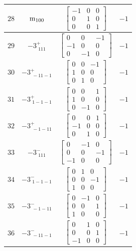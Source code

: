 \documentclass[fleqn,8pt]{jsarticle}
\begin{document}
\begin{longtable}{cccc}
$ 28 $ & $ {\rm m}_{100} $ & $ \begin{bmatrix} -1 & 0 & 0 \\ 0 & 1 & 0 \\ 0 & 0 & 1 \end{bmatrix} $ & $ -1 $ \\ \hline
$ 29 $ & $ -3^{+}_{\,\,111} $ & $ \begin{bmatrix} 0 & 0 & -1 \\ -1 & 0 & 0 \\ 0 & -1 & 0 \end{bmatrix} $ & $ -1 $ \\ \hline
$ 30 $ & $ -3^{+}_{\,\,-11-1} $ & $ \begin{bmatrix} 0 & 0 & -1 \\ 1 & 0 & 0 \\ 0 & 1 & 0 \end{bmatrix} $ & $ -1 $ \\ \hline
$ 31 $ & $ -3^{+}_{\,\,1-1-1} $ & $ \begin{bmatrix} 0 & 0 & 1 \\ 1 & 0 & 0 \\ 0 & -1 & 0 \end{bmatrix} $ & $ -1 $ \\ \hline
$ 32 $ & $ -3^{+}_{\,\,-1-11} $ & $ \begin{bmatrix} 0 & 0 & 1 \\ -1 & 0 & 0 \\ 0 & 1 & 0 \end{bmatrix} $ & $ -1 $ \\ \hline
$ 33 $ & $ -3^{-}_{\,\,111} $ & $ \begin{bmatrix} 0 & -1 & 0 \\ 0 & 0 & -1 \\ -1 & 0 & 0 \end{bmatrix} $ & $ -1 $ \\ \hline
$ 34 $ & $ -3^{-}_{\,\,1-1-1} $ & $ \begin{bmatrix} 0 & 1 & 0 \\ 0 & 0 & -1 \\ 1 & 0 & 0 \end{bmatrix} $ & $ -1 $ \\ \hline
$ 35 $ & $ -3^{-}_{\,\,-1-11} $ & $ \begin{bmatrix} 0 & -1 & 0 \\ 0 & 0 & 1 \\ 1 & 0 & 0 \end{bmatrix} $ & $ -1 $ \\ \hline
$ 36 $ & $ -3^{-}_{\,\,-11-1} $ & $ \begin{bmatrix} 0 & 1 & 0 \\ 0 & 0 & 1 \\ -1 & 0 & 0 \end{bmatrix} $ & $ -1 $ \\ \hline

\end{longtable}
\end{document}

